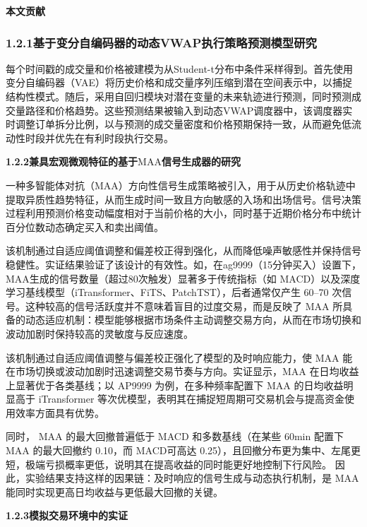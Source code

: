 \textbf{本文贡献}

\subsubsection{\texorpdfstring{\textbf{1.2.1基于变分自编码器的动态}VWAP\textbf{执行策略预测模型研究}}{1.2.1基于变分自编码器的动态VWAP执行策略预测模型研究}}

每个时间戳的成交量和价格被建模为从Student-t分布中条件采样得到。首先使用变分自编码器（VAE）将历史价格和成交量序列压缩到潜在空间表示中，以捕捉结构性模式。随后，采用自回归模块对潜在变量的未来轨迹进行预测，同时预测成交量路径和价格趋势。这些预测结果被输入到动态VWAP调度器中，该调度器实时调整订单拆分比例，以与预测的成交量密度和价格预期保持一致，从而避免低流动性时段并优先在有利时段执行交易。

\textbf{1.2.2兼具宏观微观特征的基于}MAA\textbf{信号生成器的研究}

一种多智能体对抗（MAA）方向性信号生成策略被引入，用于从历史价格轨迹中提取异质性趋势特征，从而生成时间一致且方向敏感的入场和出场信号。信号决策过程利用预测价格变动幅度相对于当前价格的大小，同时基于近期价格分布中统计百分位数动态确定买入和卖出阈值。

该机制通过自适应阈值调整和偏差校正得到强化，从而降低噪声敏感性并保持信号稳健性。实证结果验证了该设计的有效性。如，在ag9999（15分钟买入）设置下，MAA生成的信号数量（超过80次触发）显著多于传统指标（如
MACD）以及深度学习基线模型（iTransformer、FiTS、PatchTST），后者通常仅产生
60--70 次信号。这种较高的信号活跃度并不意味着盲目的过度交易，而是反映了
MAA
所具备的动态适应机制：模型能够根据市场条件主动调整交易方向，从而在市场切换和波动加剧时保持较高的灵敏度与反应速度。

该机制通过自适应阈值调整与偏差校正强化了模型的及时响应能力，使 MAA
能在市场切换或波动加剧时迅速调整交易节奏与方向。实证显示，MAA
在日均收益上显著优于各类基线；以 AP9999 为例，在多种频率配置下 MAA
的日均收益明显高于 iTransformer
等次优模型，表明其在捕捉短周期可交易机会与提高资金使用效率方面具有优势。

同时， MAA 的最大回撤普遍低于 MACD 和多数基线（在某些 60min 配置下 MAA
的最大回撤约 0.10，而 MACD可高达
0.25），且回撤分布更为集中、左尾更短，极端亏损概率更低，说明其在提高收益的同时能更好地控制下行风险。
因此，实验结果支持这样的因果链：及时响应的信号生成与动态执行机制，是 MAA
能同时实现更高日均收益与更低最大回撤的关键。

\textbf{1.2.3模拟交易环境中的实证}

